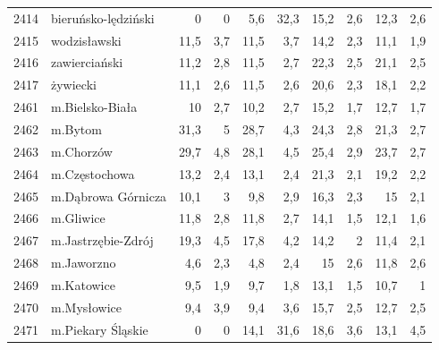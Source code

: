 \begin{center}
\begin{longtable}{lp{3cm}rrrrrrrr}
2414 & bieruńsko-lędziński     & 0       & 0           & 5,6      & 32,3         & 15,2     & 2,6          & 12,3     & 2,6          \\
2415 & wodzisławski            & 11,5    & 3,7         & 11,5     & 3,7          & 14,2     & 2,3          & 11,1     & 1,9          \\
2416 & zawierciański           & 11,2    & 2,8         & 11,5     & 2,7          & 22,3     & 2,5          & 21,1     & 2,5          \\
2417 & żywiecki                & 11,1    & 2,6         & 11,5     & 2,6          & 20,6     & 2,3          & 18,1     & 2,2          \\
2461 & m.Bielsko-Biała         & 10      & 2,7         & 10,2     & 2,7          & 15,2     & 1,7          & 12,7     & 1,7          \\
2462 & m.Bytom                 & 31,3    & 5           & 28,7     & 4,3          & 24,3     & 2,8          & 21,3     & 2,7          \\
2463 & m.Chorzów               & 29,7    & 4,8         & 28,1     & 4,5          & 25,4     & 2,9          & 23,7     & 2,7          \\
2464 & m.Częstochowa           & 13,2    & 2,4         & 13,1     & 2,4          & 21,3     & 2,1          & 19,2     & 2,2          \\
2465 & m.Dąbrowa Górnicza      & 10,1    & 3           & 9,8      & 2,9          & 16,3     & 2,3          & 15       & 2,1          \\
2466 & m.Gliwice               & 11,8    & 2,8         & 11,8     & 2,7          & 14,1     & 1,5          & 12,1     & 1,6          \\
2467 & m.Jastrzębie-Zdrój      & 19,3    & 4,5         & 17,8     & 4,2          & 14,2     & 2            & 11,4     & 2,1          \\
2468 & m.Jaworzno              & 4,6     & 2,3         & 4,8      & 2,4          & 15       & 2,6          & 11,8     & 2,6          \\
2469 & m.Katowice              & 9,5     & 1,9         & 9,7      & 1,8          & 13,1     & 1,5          & 10,7     & 1            \\
2470 & m.Mysłowice             & 9,4     & 3,9         & 9,4      & 3,6          & 15,7     & 2,5          & 12,7     & 2,5          \\
2471 & m.Piekary Śląskie       & 0       & 0           & 14,1     & 31,6         & 18,6     & 3,6          & 13,1     & 4,5          \\

\end{longtable}
\end{center}
